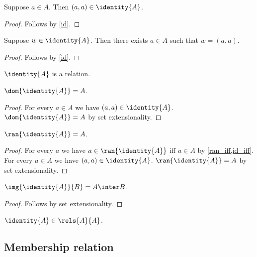 \begin{proposition}\label{id_elem_intro}
    Suppose $a\in A$.
    Then $(a, a) \in\identity{A}$.
\end{proposition}
\begin{proof}
    Follows by \cref{id}.
\end{proof}

\begin{proposition}\label{id_elem_inspect}
    Suppose $w\in\identity{A}$.
    Then there exists $a\in A$ such that $w = (a, a)$.
\end{proposition}
\begin{proof}
    Follows by \cref{id}.
\end{proof}

\begin{proposition}\label{id_is_relation}
    $\identity{A}$ is a relation.
\end{proposition}

\begin{proposition}\label{id_dom}
    $\dom{\identity{A}} = A$.
\end{proposition}
\begin{proof}
    For every $a\in A$ we have $(a, a)\in \identity{A}$.
    $\dom{\identity{A}} = A$ by set extensionality.
\end{proof}

\begin{proposition}\label{id_ran}
    $\ran{\identity{A}} = A$.
\end{proposition}
\begin{proof}
    For every $a$ we have $a\in \ran{\identity{A}}$ iff $a\in A$
        by \cref{ran_iff,id_iff}.
    For every $a\in A$ we have $(a, a)\in \identity{A}$.
    $\ran{\identity{A}} = A$ by set extensionality.
\end{proof}

\begin{proposition}\label{id_img}
    $\img{\identity{A}}{B} = A\inter B$.
\end{proposition}
\begin{proof}
    Follows by set extensionality.
\end{proof}

\begin{proposition}\label{id_elem_rels}
    $\identity{A}\in\rels{A}{A}$.
\end{proposition}

\subsection{Membership relation}

